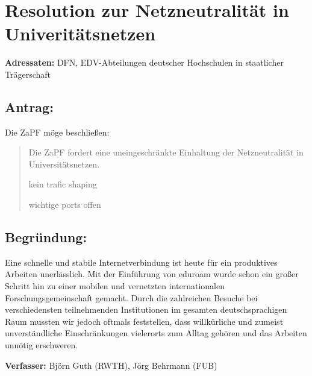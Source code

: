 \documentclass[12pt,oneside]{scrartcl}
\begin{document}
\section*{Resolution zur Netzneutralität in Univeritätsnetzen}

\textbf{Adressaten:} DFN, EDV-Abteilungen deutscher Hochschulen in staatlicher Trägerschaft

\subsection*{Antrag:}
Die ZaPF möge beschließen:
\begin{quote}
Die ZaPF fordert eine uneingeschränkte Einhaltung der Netzneutralität in Universitätsnetzen.

kein trafic shaping

wichtige ports offen
\end{quote}

\subsection*{Begründung:}

Eine schnelle und stabile Internetverbindung ist heute für ein produktives Arbeiten unerlässlich. Mit der Einführung von eduroam wurde schon ein großer Schritt hin zu einer mobilen und vernetzten internationalen Forschungsgemeinschaft gemacht. Durch die zahlreichen Besuche bei verschiedensten teilnehmenden Institutionen im gesamten deutschsprachigen Raum mussten wir jedoch oftmals feststellen, dass willkürliche und zumeist unverständliche Einschränkungen vielerorts zum Alltag gehören und das Arbeiten unnötig erschweren.

\vspace{1cm}
\textbf{Verfasser:} Björn Guth (RWTH), Jörg Behrmann (FUB)
\end{document}
